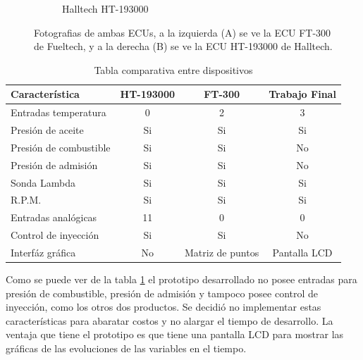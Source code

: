 \begin{figure}[htpb]
\begin{subfigure}{.5\textwidth}
\caption{Halltech HT-193000}
\label{fig:halltech}
\end{subfigure}
\hfill
\caption{Fotografias de ambas ECUs, a la izquierda (A) se ve la ECU FT-300 de Fueltech, y a la derecha (B) se ve la ECU HT-193000 de Halltech.}
\label{fig:comparativa}
\end{figure}
\hfil
\begin{table}[h]
	\centering
	\caption[Tabla comparativa entre dispositivos]{Tabla comparativa entre dispositivos}
	\centering
	\begin{tabular}{l c c c}    
		\toprule
		\textbf{Característica }     & \textbf{HT-193000} & \textbf{FT-300} & \textbf{Trabajo Final}\\
		\midrule
		Entradas temperatura	&  0 &   2 &  3\\
		Presión de aceite		& Si &  Si & Si\\
		Presión de combustible	& Si &  Si & No\\
		Presión de admisión		& Si &  Si & No\\
		Sonda Lambda			& Si &  Si & Si\\
		R.P.M.					& Si &  Si & Si\\
		Entradas analógicas		& 11 &  0  &  0\\
		Control de inyección	& Si &  Si & No\\
		Interfáz gráfica		& No &  Matriz de puntos & Pantalla LCD \\
		\bottomrule
	\end{tabular}
	\label{tab:comparativa}
\end{table}

Como se puede ver de la tabla \ref{tab:comparativa} el prototipo desarrollado no posee entradas para presión de combustible, presión de admisión y tampoco posee control de inyección, como los otros dos productos. Se decidió no implementar estas características para abaratar costos y no alargar el tiempo de desarrollo. La ventaja que tiene el prototipo es que tiene una pantalla LCD para mostrar las gráficas de las evoluciones de las variables en el tiempo.
